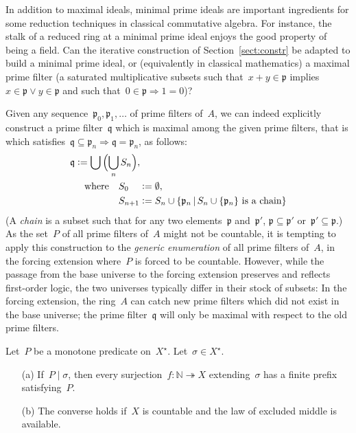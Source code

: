 \documentclass[envcountsect,envcountsame,runningheads]{llncs}
\newcommand{\ppp}{\mathfrak{p}}
\newcommand{\qqq}{\mathfrak{q}}
\newcommand{\NN}{\mathbb{N}}
\newcommand{\defeq}{\vcentcolon=}
\renewcommand{\_}{\mathpunct{.}\,}
\begin{document}
\begin{remark}In addition to maximal ideals, minimal prime ideals are important
ingredients for some reduction techniques in classical commutative algebra. For
instance, the stalk of a reduced ring at a minimal prime ideal enjoys the good
property of being a field. Can the iterative construction of Section~\ref{sect:constr} be adapted to
build a minimal prime ideal, or (equivalently in classical mathematics) a maximal prime
filter (a saturated multiplicative subsets such that~$x + y \in \ppp$
implies~$x \in \ppp \vee y \in \ppp$ and such that~$0 \in \ppp \Rightarrow 1 = 0$)?

Given any sequence~$\ppp_0,\ppp_1,\ldots$ of prime filters of~$A$, we can indeed
explicitly construct a prime filter~$\qqq$ which is maximal among the given
prime filters, that is which satisfies~$\qqq \subseteq \ppp_n \Rightarrow \qqq
= \ppp_n$, as follows:
\begin{align*}
  \qqq &\defeq \bigcup\,\Bigl(\bigcup_n S_n\Bigr), \\
  &\quad\text{where}\quad S_{0\phantom{{}+n}} \defeq \emptyset, \\
  &\quad\phantom{\text{where}\quad} S_{n+1} \defeq S_n \cup \{ \ppp_n \,|\,
  \text{$S_n \cup \{\ppp_n\}$ is a chain} \}
\end{align*}
(A \emph{chain} is a subset such that for any two elements~$\ppp$ and~$\ppp'$,
$\ppp \subseteq \ppp'$ or~$\ppp' \subseteq \ppp$.) As the set~$P$ of all prime
filters of~$A$ might not be countable, it is tempting to apply this
construction to the \emph{generic enumeration} of all prime filters of~$A$,
in the forcing extension where~$P$ is forced to be countable. However,
while the passage from the base universe to the forcing extension preserves and
reflects first-order logic, the two universes typically differ in their stock
of subsets: In the forcing extension, the ring~$A$ can catch new prime filters
which did not exist in the base universe; the prime filter~$\qqq$ will only be
maximal with respect to the old prime filters.
\end{remark}

\color{gray}

\begin{proposition}Let~$P$ be a monotone predicate on~$X^\star$. Let~$\sigma
\in X^\star$.
\begin{enumerate}
\item[\textnormal{(a)}] If~$P \mid \sigma$, then every surjection~$f : \NN
\twoheadrightarrow X$
extending~$\sigma$ has a finite prefix satisfying~$P$.
\item[\textnormal{(b)}] The converse holds if~$X$ is countable and the law of excluded middle
is available.
\end{enumerate}
\end{proposition}
\end{document}
